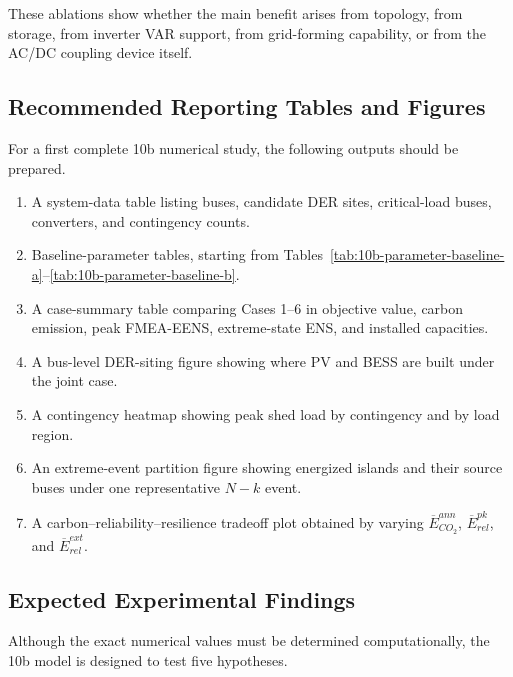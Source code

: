 These ablations show whether the main benefit arises from topology, from storage, from inverter VAR support, from grid-forming capability, or from the AC/DC coupling device itself.

\subsection{Recommended Reporting Tables and Figures}

For a first complete 10b numerical study, the following outputs should be prepared.

\begin{enumerate}
  \item A system-data table listing buses, candidate DER sites, critical-load buses, converters, and contingency counts.
  \item Baseline-parameter tables, starting from Tables~\ref{tab:10b-parameter-baseline-a}--\ref{tab:10b-parameter-baseline-b}.
  \item A case-summary table comparing Cases 1--6 in objective value, carbon emission, peak FMEA-EENS, extreme-state ENS, and installed capacities.
  \item A bus-level DER-siting figure showing where PV and BESS are built under the joint case.
  \item A contingency heatmap showing peak shed load by contingency and by load region.
  \item An extreme-event partition figure showing energized islands and their source buses under one representative \(N{-}k\) event.
  \item A carbon--reliability--resilience tradeoff plot obtained by varying \(\overline E^{ann}_{CO_2}\), \(\overline E^{pk}_{rel}\), and \(\overline E^{ext}_{rel}\).
\end{enumerate}

\subsection{Expected Experimental Findings}

Although the exact numerical values must be determined computationally, the 10b model is designed to test five hypotheses.

